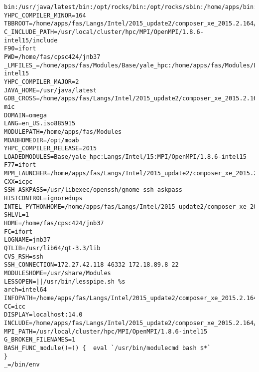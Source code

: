 \documentclass[11pt]{article}
\begin{document}
\begin{verbatim}
bin:/usr/java/latest/bin:/opt/rocks/bin:/opt/rocks/sbin:/home/apps/bin:/home/fas/cpsc424/jnb37/bin
YHPC_COMPILER_MINOR=164
TBBROOT=/home/apps/fas/Langs/Intel/2015_update2/composer_xe_2015.2.164/tbb
C_INCLUDE_PATH=/usr/local/cluster/hpc/MPI/OpenMPI/1.8.6-intel15/include
F90=ifort
PWD=/home/fas/cpsc424/jnb37
_LMFILES_=/home/apps/fas/Modules/Base/yale_hpc:/home/apps/fas/Modules/Langs/Intel/15:/home/apps/fas/Modules/MPI/OpenMPI/1.8.6-intel15
YHPC_COMPILER_MAJOR=2
JAVA_HOME=/usr/java/latest
GDB_CROSS=/home/apps/fas/Langs/Intel/2015_update2/composer_xe_2015.2.164/debugger/gdb/intel64_mic/bin/gdb-mic
DOMAIN=omega
LANG=en_US.iso885915
MODULEPATH=/home/apps/fas/Modules
MOABHOMEDIR=/opt/moab
YHPC_COMPILER_RELEASE=2015
LOADEDMODULES=Base/yale_hpc:Langs/Intel/15:MPI/OpenMPI/1.8.6-intel15
F77=ifort
MPM_LAUNCHER=/home/apps/fas/Langs/Intel/2015_update2/composer_xe_2015.2.164/debugger/mpm/bin/start_mpm.sh
CXX=icpc
SSH_ASKPASS=/usr/libexec/openssh/gnome-ssh-askpass
HISTCONTROL=ignoredups
INTEL_PYTHONHOME=/home/apps/fas/Langs/Intel/2015_update2/composer_xe_2015.2.164/debugger/python/intel64/
SHLVL=1
HOME=/home/fas/cpsc424/jnb37
FC=ifort
LOGNAME=jnb37
QTLIB=/usr/lib64/qt-3.3/lib
CVS_RSH=ssh
SSH_CONNECTION=172.27.42.118 46332 172.18.89.8 22
MODULESHOME=/usr/share/Modules
LESSOPEN=||/usr/bin/lesspipe.sh %s
arch=intel64
INFOPATH=/home/apps/fas/Langs/Intel/2015_update2/composer_xe_2015.2.164/debugger/gdb/intel64/share/info/:/home/apps/fas/Langs/Intel/2015_update2/composer_xe_2015.2.164/debugger/gdb/intel64_mic/share/info/
CC=icc
DISPLAY=localhost:14.0
INCLUDE=/home/apps/fas/Langs/Intel/2015_update2/composer_xe_2015.2.164/mkl/include
MPI_PATH=/usr/local/cluster/hpc/MPI/OpenMPI/1.8.6-intel15
G_BROKEN_FILENAMES=1
BASH_FUNC_module()=() {  eval `/usr/bin/modulecmd bash $*`
}
_=/bin/env
\end{verbatim}
\end{document}
